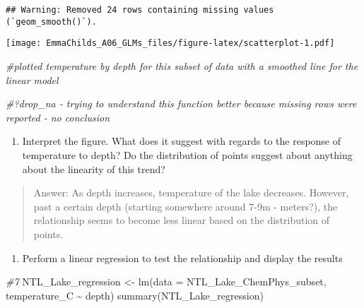 \documentclass[
]{article}
\newenvironment{Shaded}{\begin{snugshade}}{\end{snugshade}}
\newcommand{\AttributeTok}[1]{\textcolor[rgb]{0.77,0.63,0.00}{#1}}
\newcommand{\CommentTok}[1]{\textcolor[rgb]{0.56,0.35,0.01}{\textit{#1}}}
\newcommand{\FunctionTok}[1]{\textcolor[rgb]{0.00,0.00,0.00}{#1}}
\newcommand{\NormalTok}[1]{#1}
\newcommand{\OtherTok}[1]{\textcolor[rgb]{0.56,0.35,0.01}{#1}}
\newcommand{\SpecialCharTok}[1]{\textcolor[rgb]{0.00,0.00,0.00}{#1}}
\providecommand{\tightlist}{%
  \setlength{\itemsep}{0pt}\setlength{\parskip}{0pt}}
\begin{document}
\begin{verbatim}
## Warning: Removed 24 rows containing missing values (`geom_smooth()`).
\end{verbatim}

\texttt{[image: EmmaChilds\_A06\_GLMs\_files/figure-latex/scatterplot-1.pdf]}

\begin{Shaded}
\begin{Highlighting}[]
\CommentTok{\#plotted temperature by depth for this subset of data with a smoothed line for the linear model}

\CommentTok{\#?drop\_na {-} trying to understand this function better because missing rows were reported {-} no conclusion }
\end{Highlighting}
\end{Shaded}

\begin{enumerate}
\def\labelenumi{\arabic{enumi}.}
\setcounter{enumi}{5}
\tightlist
\item
  Interpret the figure. What does it suggest with regards to the
  response of temperature to depth? Do the distribution of points
  suggest about anything about the linearity of this trend?
\end{enumerate}

\begin{quote}
Answer: As depth increases, temperature of the lake decreases. However,
past a certain depth (starting somewhere around 7-9m - meters?), the
relationship seems to become less linear based on the distribution of
points.
\end{quote}

\begin{enumerate}
\def\labelenumi{\arabic{enumi}.}
\setcounter{enumi}{6}
\tightlist
\item
  Perform a linear regression to test the relationship and display the
  results
\end{enumerate}

\begin{Shaded}
\begin{Highlighting}[]
\CommentTok{\#7}
\NormalTok{NTL\_Lake\_regression }\OtherTok{\textless{}{-}} \FunctionTok{lm}\NormalTok{(}\AttributeTok{data =}\NormalTok{ NTL\_Lake\_ChemPhys\_subset, temperature\_C }\SpecialCharTok{\textasciitilde{}}\NormalTok{ depth)}
\FunctionTok{summary}\NormalTok{(NTL\_Lake\_regression)}
\end{Highlighting}
\end{Shaded}
\end{document}
